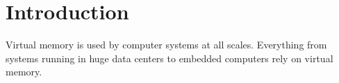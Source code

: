 \chapter{Introduction} %























\label{Intro}

Virtual memory is used by computer systems at all scales. Everything from systems running in huge data
centers to embedded computers rely on virtual memory.

